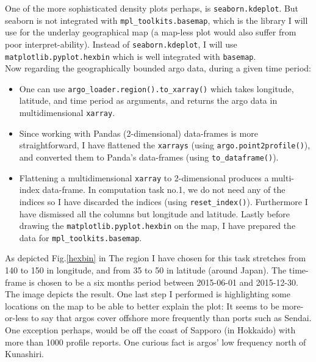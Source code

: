 \documentclass[12pt]{article}
\begin{document}
One of the more sophisticated density plots perhaps, is 
\verb|seaborn.kdeplot|. 
But seaborn is not integrated with \verb|mpl_toolkits.basemap|,
which is the library I will use for the underlay geographical 
map (a map-less plot would also suffer from poor interpret-ability). 
Instead of \verb|seaborn.kdeplot|, I will use 
\verb|matplotlib.pyplot.hexbin| which
is well integrated with \verb|basemap|.\\

Now regarding the geographically bounded argo data, 
during a given time period:
 \begin{itemize}
     \item One can use \verb|argo_loader.region().to_xarray()| which takes longitude, latitude, and time period as arguments, and 
     returns the argo data in multidimensional \verb|xarray|.
     \item Since working
     with Pandas (2-dimensional) data-frames is more straightforward, 
     I have flattened the \verb|xarrays| 
     (using \verb|argo.point2profile()|),
     and converted them to Panda's data-frames 
     (using \verb|to_dataframe()|).
     \item Flattening a multidimensional \verb|xarray| to 
     2-dimensional produces a multi-index data-frame. 
     In computation task no.1, 
     we do not need any of the indices so I have discarded 
     the indices (using \verb|reset_index()|). Furthermore I 
     have dismissed all
     the columns but longitude and latitude. 
     Lastly before 
     drawing the \verb|matplotlib.pyplot.hexbin| on the map, I have
     prepared the data for \verb|mpl_toolkits.basemap|.
 \end{itemize}

 As depicted Fig.\ref{hexbin} in The region I have chosen for 
 this task stretches from 140 to 150 
 in longitude, and from 35 to 50 in latitude (around Japan). 
 The time-frame is chosen to be a six months period between 
 2015-06-01 and 2015-12-30. The image depicts the result. One
 last step I performed is highlighting some locations on the map 
 to be able to better explain the plot: It seems to be
 more-or-less to say that argos cover offshore more frequently 
 than ports such as Sendai. One exception perhaps, would be
 off the coast of Sapporo (in Hokkaido) with more than 1000 profile 
 reports. One curious fact is argos' low frequency north of Kunashiri.    
\end{document}
